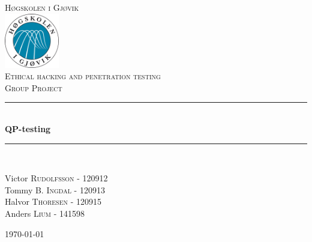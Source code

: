 \documentclass[12pt]{article} %
\begin{document}

\begin{titlepage}

\newcommand{\HRule}{\rule{\linewidth}{0.5mm}} %

\center %

\textsc{\LARGE Høgskolen i Gjøvik}\\[0.5cm] %
\includegraphics[width=90px, height=90px]{./Graphics/Hig-logo.png}\\[0.8cm] %
\textsc{\Large Ethical hacking and penetration testing}\\[0.5cm] %
\textsc{\large Group Project}\\[0.5cm] %

\HRule \\[0.4cm]
{ \huge \bfseries QP-testing}\\[0.4cm] %
\HRule \\[1.5cm]

\begin{minipage}{0.44\textwidth}
\begin{flushleft} \large
Victor \textsc{Rudolfsson} - 120912\\ %
Tommy \textsc{B. Ingdal} - 120913\\ %
Halvor \textsc{Thoresen} - 120915\\ %
Anders \textsc{Lium} - 141598\\ %
\end{flushleft}
\end{minipage}

\vfill %
{\large \today}\\[3cm] %

\end{titlepage}
\end{document}
